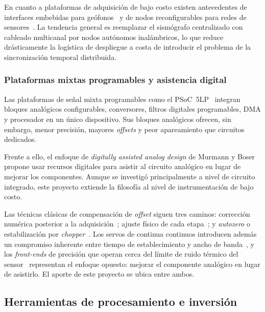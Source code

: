 En cuanto a plataformas de adquisici\'on de bajo costo existen antecedentes de interfaces
embebidas para ge\'ofonos~\cite{Kafadar2020,Wijayaraja2024} y de nodos reconfigurables
para redes de sensores~\cite{Guevara2015}. La tendencia general es reemplazar el
sismógrafo centralizado con cableado multicanal por nodos aut\'onomos inal\'ambricos, lo
que reduce dr\'asticamente la log\'istica de despliegue a costa de introducir el problema
de la sincronizaci\'on temporal distribuida.

\subsubsection{Plataformas mixtas programables y asistencia digital}

Las plataformas de se\~nal mixta programables como el PSoC~5LP~\cite{InfineonPSoC}
integran bloques anal\'ogicos configurables, conversores, filtros digitales programables,
DMA y procesador en un \'unico dispositivo. Sus bloques anal\'ogicos ofrecen, sin embargo,
menor precisi\'on, mayores \emph{offsets} y peor apareamiento que circuitos dedicados.

Frente a ello, el enfoque de \emph{digitally assisted analog design} de Murmann y
Boser~\cite{Murmann2004,Murmann2006} propone usar recursos digitales para asistir al
circuito anal\'ogico en lugar de mejorar los componentes. Aunque se investig\'o
principalmente a nivel de circuito integrado, este proyecto extiende la filosof\'ia al
nivel de instrumentaci\'on de bajo costo.

Las t\'ecnicas cl\'asicas de compensaci\'on de \emph{offset} siguen tres caminos:
correcci\'on num\'erica posterior a la adquisici\'on~\cite{InfineonAN68403,Lopin2018};
ajuste f\'isico de cada etapa~\cite{Mohan2020}; y \emph{autozero} o estabilizaci\'on por
\emph{chopper}~\cite{EnzTemes1996,Liu2020}. Los servos de continua continuos introducen
adem\'as un compromiso inherente entre tiempo de establecimiento y ancho de
banda~\cite{Liu2020,Antoniadis2025}, y los \emph{front-ends} de precisi\'on que operan
cerca del l\'imite de ruido t\'ermico del sensor~\cite{Kirchhoff2017} representan el
enfoque opuesto: mejorar el componente anal\'ogico en lugar de asistirlo. El aporte de
este proyecto se ubica entre ambos.

\subsection{Herramientas de procesamiento e inversi\'on}


